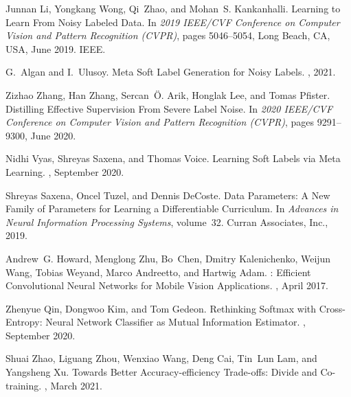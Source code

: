 \documentclass{article}
\begin{document}
\begin{thebibliography}{10}
  Junnan Li, Yongkang Wong, Qi~Zhao, and Mohan~S. Kankanhalli.
  \newblock Learning to {{Learn From Noisy Labeled Data}}.
  \newblock In {\em 2019 {{IEEE}}/{{CVF Conference}} on {{Computer Vision}} and
    {{Pattern Recognition}} ({{CVPR}})}, pages 5046--5054, {Long Beach, CA, USA},
    June 2019. {IEEE}.
  
  G.~Algan and I.~Ulusoy.
  \newblock Meta {{Soft Label Generation}} for {{Noisy Labels}}.
  , 2021.
  
  Zizhao Zhang, Han Zhang, Sercan~{\"O}. Arik, Honglak Lee, and Tomas Pfister.
  \newblock Distilling {{Effective Supervision From Severe Label Noise}}.
  \newblock In {\em 2020 {{IEEE}}/{{CVF Conference}} on {{Computer Vision}} and
    {{Pattern Recognition}} ({{CVPR}})}, pages 9291--9300, June 2020.
  
  Nidhi Vyas, Shreyas Saxena, and Thomas Voice.
  \newblock Learning {{Soft Labels}} via {{Meta Learning}}.
  , September 2020.
  
  Shreyas Saxena, Oncel Tuzel, and Dennis DeCoste.
  \newblock Data {{Parameters}}: A {{New Family}} of {{Parameters}} for
    {{Learning}} a {{Differentiable Curriculum}}.
  \newblock In {\em Advances in {{Neural Information Processing Systems}}},
    volume~32. {Curran Associates, Inc.}, 2019.
  
  Andrew~G. Howard, Menglong Zhu, Bo~Chen, Dmitry Kalenichenko, Weijun Wang,
    Tobias Weyand, Marco Andreetto, and Hartwig Adam.
  : Efficient {{Convolutional Neural Networks}} for
    {{Mobile Vision Applications}}.
  , April 2017.
  
  Zhenyue Qin, Dongwoo Kim, and Tom Gedeon.
  \newblock Rethinking {{Softmax}} with {{Cross}}-{{Entropy}}: Neural {{Network
    Classifier}} as {{Mutual Information Estimator}}.
  , September 2020.
  
  Shuai Zhao, Liguang Zhou, Wenxiao Wang, Deng Cai, Tin~Lun Lam, and Yangsheng
    Xu.
  \newblock Towards {{Better Accuracy}}-efficiency {{Trade}}-offs: Divide and
    {{Co}}-training.
  , March 2021.
  

\end{thebibliography}
\end{document}
